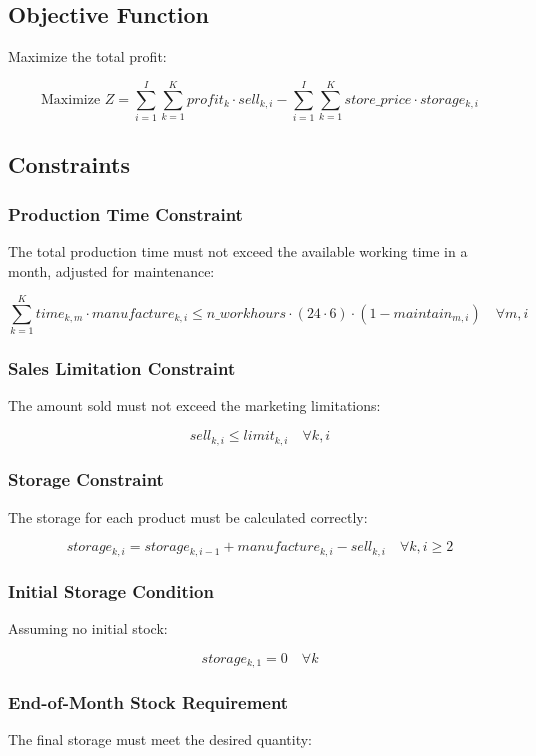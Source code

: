 \documentclass{article}
\begin{document}
\subsection*{Objective Function}
Maximize the total profit:

\[
\text{Maximize } Z = \sum_{i=1}^{I} \sum_{k=1}^{K} profit_k \cdot sell_{k,i} - \sum_{i=1}^{I} \sum_{k=1}^{K} store\_price \cdot storage_{k,i}
\]

\subsection*{Constraints}

\subsubsection*{Production Time Constraint}
The total production time must not exceed the available working time in a month, adjusted for maintenance:

\[
\sum_{k=1}^{K} time_{k,m} \cdot manufacture_{k,i} \leq n\_workhours \cdot (24 \cdot 6) \cdot (1 - maintain_{m,i}) \quad \forall m, i
\]

\subsubsection*{Sales Limitation Constraint}
The amount sold must not exceed the marketing limitations:

\[
sell_{k,i} \leq limit_{k,i} \quad \forall k, i
\]

\subsubsection*{Storage Constraint}
The storage for each product must be calculated correctly:

\[
storage_{k,i} = storage_{k,i-1} + manufacture_{k,i} - sell_{k,i} \quad \forall k, i \geq 2
\]

\subsubsection*{Initial Storage Condition}
Assuming no initial stock:

\[
storage_{k,1} = 0 \quad \forall k
\]

\subsubsection*{End-of-Month Stock Requirement}
The final storage must meet the desired quantity:
\end{document}
